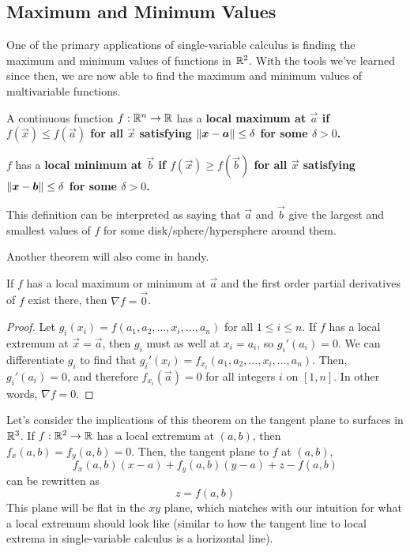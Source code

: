 \subsection{Maximum and Minimum Values}
One of the primary applications of single-variable calculus is finding the maximum and minimum values of functions in \(\mathbb{R}^2\). With the tools we've learned since then, we are now able to find the maximum and minimum values of multivariable functions.
\begin{definition}
    A continuous function \(f: \mathbb{R}^n\to \mathbb{R}\) has a \bf{local maximum} at \(\vec a\) if \(f(\vec x) \leq f(\vec a)\) for all \(\vec x\) satisfying \(\norm{\boldsymbol{x} - \boldsymbol{a}} \leq \delta\) for some \(\delta > 0\). \par
    \(f\) has a \bf{local minimum} at \(\vec b\) if \(f(\vec x)\geq f(\vec b)\) for all \(\vec x\) satisfying \(\norm{\boldsymbol{x} - \boldsymbol{b}} \leq \delta\) for some \(\delta > 0\).
\end{definition}
This definition can be interpreted as saying that \(\vec a\) and \(\vec b\) give the largest and smallest values of \(f\) for some disk/sphere/hypersphere around them.\par Another theorem will also come in handy.
\begin{theorem}
    If \(f\) has a local maximum or minimum at \(\vec a\) and the first order partial derivatives of \(f\) exist there, then \(\nabla f = \vec 0\).
\end{theorem}
\begin{proof}
    Let \(g_i(x_i) = f(a_1, a_2, \dots, x_i, \dots, a_n)\) for all \(1\leq i\leq n\). If \(f\) has a local extremum at \(\vec x = \vec a\), then \(g_i\) must as well at \(x_i=a_i\), so \(g_i'(a_i)=0\). We can differentiate \(g_i\) to find that \(g_i'(x_i) = f_{x_i}(a_1, a_2, \dots, x_i, \dots, a_n)\). Then, \(g_i'(a_i)=0\), and therefore \(f_{x_i}(\vec a) = 0\) for all integers \(i\) on \([1, n]\). In other words, \(\nabla f = 0\).
\end{proof}
Let's consider the implications of this theorem on the tangent plane to surfaces in \(\mathbb{R}^3\). If \(f: \mathbb{R}^2\to \mathbb{R}\) has a local extremum at \((a, b)\), then \(f_x(a,b)=f_y(a,b)=0\). Then, the tangent plane to \(f\) at \((a,b)\),
\[ f_x(a,b)(x - a) + f_y(a,b)(y-a) + z-f(a, b) \]
can be rewritten as
\[ z = f(a,b) \]
This plane will be flat in the \(xy\) plane, which matches with our intuition for what a local extremum should look like (similar to how the tangent line to local extrema in single-variable calculus is a horizontal line).\par
